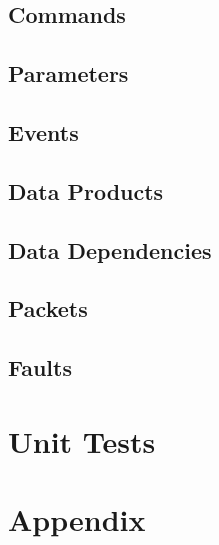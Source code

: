 \subsection{Commands}



\subsection{Parameters}



\subsection{Events}



\subsection{Data Products}



\subsection{Data Dependencies}



\subsection{Packets}



\subsection{Faults}



\section{Unit Tests}



\section{Appendix}


